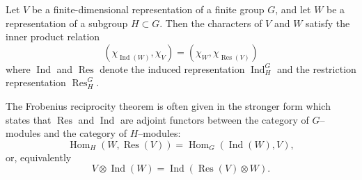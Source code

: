 \documentclass[12pt]{article}
\newcommand{\Ind}{\operatorname{Ind}}
\newcommand{\Res}{\operatorname{Res}}
\newcommand{\Hom}{\operatorname{Hom}}
\begin{document}
Let $V$ be a finite-dimensional representation of a finite group $G$, and let $W$ be a representation of a subgroup $H \subset G$. Then the characters of $V$ and $W$ satisfy the inner product relation
$$
(\chi_{\Ind(W)}, \chi_V) = (\chi_W, \chi_{\Res(V)})
$$
where $\Ind$ and $\Res$ denote the induced representation $\Ind_H^G$ and the restriction representation $\Res_H^G$.

The Frobenius reciprocity theorem is often given in the stronger form which states  that $\Res$ and $\Ind$ are adjoint functors between the category of $G$--modules and the category of $H$--modules:
$$
\Hom_H(W, \Res(V)) = \Hom_G(\Ind(W),V),
$$
or, equivalently
$$
V \otimes \Ind(W) = \Ind(\Res(V) \otimes W).
$$
\end{document}

